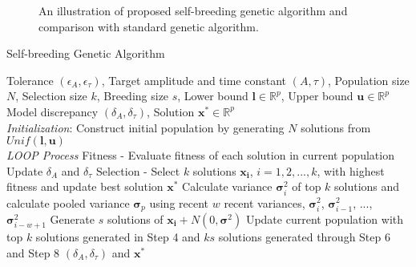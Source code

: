 \documentclass[10pt,letterpaper]{article}
\begin{document}
\begin{figure}[!ht]
    \centering
    \caption{An illustration of proposed self-breeding genetic algorithm and comparison with standard genetic algorithm.}
    \label{fig5}
\end{figure}

\begin{algorithm}[!ht]
    \caption{Self-breeding Genetic Algorithm}
    \begin{algorithmic}[1-=0+-*]
        \renewcommand{\algorithmicrequire}{\textbf{Input:}}
        \renewcommand{\algorithmicensure}{\textbf{Output:}}
        \REQUIRE Tolerance $(\epsilon_{A}, \epsilon_{\tau})$, Target amplitude and time constant $(A, \tau)$, Population size $N$, Selection size $k$, Breeding size $s$, Lower bound $\mathbf{l} \in \mathbb{R}^p$, Upper bound $\mathbf{u} \in \mathbb{R}^p$
        \ENSURE Model discrepancy $(\delta_{A}, \delta_{\tau})$, Solution $\mathbf{x}^* \in \mathbb{R}^p$
        \\ \textit{Initialization}:
        \STATE Construct initial population by generating $N$ solutions from $Unif(\mathbf{l}, \mathbf{u})$
        \\ \textit{LOOP Process}
        \STATE Fitness - Evaluate fitness of each solution in current population        
        \STATE Update $\delta_{A}$ and $\delta_{\tau}$
        \STATE Selection - Select $k$ solutions $\mathbf{x_i}$, $i=1,2,...,k$, with highest fitness and update best solution $\mathbf{x^{*}}$
        \STATE Calculate variance $\mathbf{\sigma}^2_{i}$ of top $k$ solutions and calculate pooled variance $\mathbf{\sigma}_{p}$ using recent $w$ recent variances, $\mathbf{\sigma}^2_{i}$, $\mathbf{\sigma}^2_{i-1}$, ..., $\mathbf{\sigma}^2_{i-w+1}$
            \STATE Generate $s$ solutions of $\mathbf{x_i} + N(0,\mathbf{\sigma}^2)$
        \ENDFOR
        \STATE Update current population with top $k$ solutions generated in Step 4 and $ks$ solutions generated through Step 6 and Step 8
        \ENDWHILE
        \RETURN $(\delta_{A}, \delta_{\tau})$ and $\mathbf{x}^*$
    \end{algorithmic}
    \label{alg2}
\end{algorithm}

\end{document}
